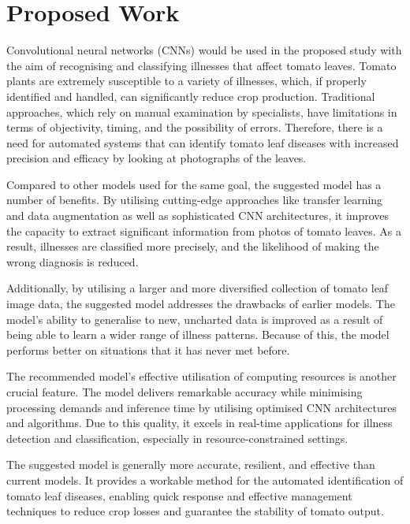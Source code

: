 \documentclass[conference]{IEEEtran}
\begin{document}



\section{Proposed Work}
Convolutional neural networks (CNNs) would be used in the proposed study with the aim of recognising and classifying illnesses that affect tomato leaves. Tomato plants are extremely susceptible to a variety of illnesses, which, if properly identified and handled, can significantly reduce crop production. Traditional approaches, which rely on manual examination by specialists, have limitations in terms of objectivity, timing, and the possibility of errors. Therefore, there is a need for automated systems that can identify tomato leaf diseases with increased precision and efficacy by looking at photographs of the leaves.

Compared to other models used for the same goal, the suggested model has a number of benefits. By utilising cutting-edge approaches like transfer learning and data augmentation as well as sophisticated CNN architectures, it improves the capacity to extract significant information from photos of tomato leaves. As a result, illnesses are classified more precisely, and the likelihood of making the wrong diagnosis is reduced.

Additionally, by utilising a larger and more diversified collection of tomato leaf image data, the suggested model addresses the drawbacks of earlier models. The model's ability to generalise to new, uncharted data is improved as a result of being able to learn a wider range of illness patterns. Because of this, the model performs better on situations that it has never met before.

The recommended model's effective utilisation of computing resources is another crucial feature. The model delivers remarkable accuracy while minimising processing demands and inference time by utilising optimised CNN architectures and algorithms. Due to this quality, it excels in real-time applications for illness detection and classification, especially in resource-constrained settings.

The suggested model is generally more accurate, resilient, and effective than current models. It provides a workable method for the automated identification of tomato leaf diseases, enabling quick response and effective management techniques to reduce crop losses and guarantee the stability of tomato output.
\end{document}
